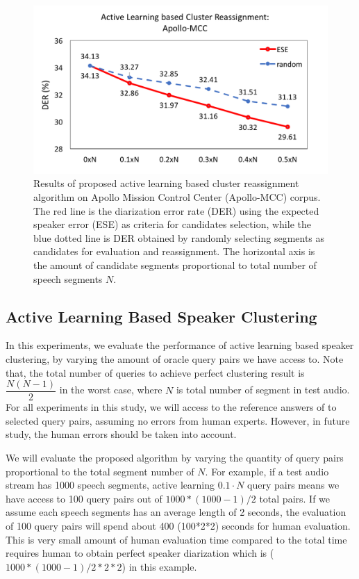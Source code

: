 \documentclass[journal,10pt]{IEEEtran}
\begin{document}
\begin{figure}
	\includegraphics[width=\linewidth]{figs/exp2_1}
	\caption{Results of proposed active learning based cluster reassignment algorithm on Apollo Mission Control Center (Apollo-MCC) corpus. The red line is the diarization error rate (DER) using the expected speaker error (ESE) as criteria for candidates selection, while the blue dotted line is DER obtained by randomly selecting segments as candidates for evaluation and reassignment. The horizontal axis is the amount of candidate segments proportional to total number of speech segments $N$.}
	\label{exp2_2}
\end{figure}

\subsection{Active Learning Based Speaker Clustering}
In this experiments, we evaluate the performance of active learning based speaker clustering, by varying the amount of oracle query pairs we have access to. Note that, the total number of queries to achieve perfect clustering result is $\dfrac{N(N-1)}{2}$ in the worst case, where $N$ is total number of segment in test audio.
For all experiments in this study, we will access to the reference answers of to selected query pairs, assuming no errors from human experts. However, in future study, the human errors should be taken into account.

We will evaluate the proposed algorithm by varying the quantity of query pairs proportional to the total segment number of $N$. For example, if a test audio stream has 1000 speech segments, active learning $0.1\cdot N$ query pairs means we have access to 100 query pairs out of $1000*(1000-1)/2$ total pairs. If we assume each speech segments has an average length of 2 seconds, the evaluation of 100 query pairs will spend about 400 (100*2*2) seconds for human evaluation. This is very small amount of human evaluation time compared to the total time requires human to obtain perfect speaker diarization which is ($1000*(1000-1)/2*2*2$) in this example.
\end{document}
